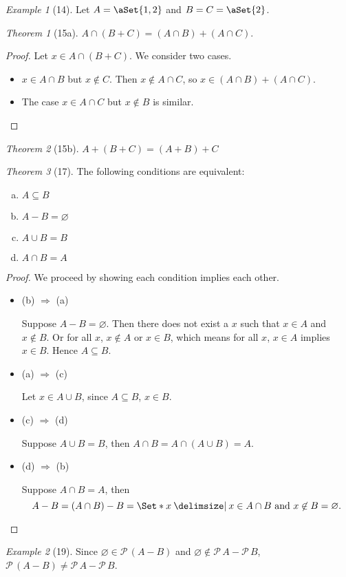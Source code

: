 \documentclass[12pt]{article}
\theoremstyle{plain}
\theoremstyle{remark}
\newtheorem*{exthm}{Theorem}
\newtheorem*{eg}{Example}
\theoremstyle{definition}
\theoremstyle{remark}
\newcommand{\powerset}{\mathscr{P}\,}
\providecommand\st{}
\newcommand\SetSymbol[1][]{%
 \nonscript\:#1\vert%
 \allowbreak%
 \nonscript\:
\mathopen{}}
\renewcommand\st{\SetSymbol[\delimsize]}
\DeclarePairedDelimiter\aSet\{\}
\begin{document}
\begin{eg}[14]
 Let $A = \aSet{1,2}$ and $B = C = \aSet{2}$.
\end{eg}

\begin{exthm}[15a]
 $A \cap (B + C) = (A \cap B) + (A \cap C)$.
\end{exthm}
\begin{proof}
 Let $x \in A \cap (B + C)$. We consider two cases.
 \begin{itemize}
  \item $x \in A \cap B$ but $x \not\in C$. Then $x \not\in A \cap C$, so $x \in (A \cap B) + (A \cap C)$.
  \item The case $x \in A \cap C$ but $x \not\in B$ is similar.
 \end{itemize}
\end{proof}
\begin{exthm}[15b]
 $A + (B + C) = (A + B) + C$
\end{exthm}

\begin{exthm}[17]
 The following conditions are equivalent:
 \begin{multicols}{2}
  \begin{enumerate}[(a)]
   \item $A \subseteq B$
   \item $A - B = \varnothing$
   \item $A \cup B = B$
   \item $A \cap B = A$
  \end{enumerate}
 \end{multicols}
\end{exthm}
\begin{proof}
 We proceed by showing each condition implies each other.
 \begin{itemize}
  \item (b) $\Rightarrow$ (a)

   Suppose $A - B = \varnothing$. Then there does not exist a $x$ such that $x \in A$ and $x \not\in B$. Or for all $x$, $x \not\in A$ or $x \in B$, which means for all $x$, $x \in A$ implies $x \in B$. Hence $A \subseteq B$.
  \item (a) $\Rightarrow$ (c)

   Let $x \in A \cup B$, since $A \subseteq B$, $x \in B$.

  \item (c) $\Rightarrow$ (d)

   Suppose $A \cup B = B$, then $A \cap B = A \cap (A \cup B) = A$.

  \item (d) $\Rightarrow$ (b)

   Suppose $A \cap B = A$, then
   \[
   A - B = (A \cap B) - B = \Set*{x \st x \in A \cap B\ \text{and}\ x \not\in B} = \varnothing.
  \]

 \end{itemize}
\end{proof}
\begin{eg}[19]
 Since $\varnothing \in \powerset (A - B)$ and $\varnothing \not\in \powerset A - \powerset B$, $\powerset(A - B) \neq \powerset A - \powerset B$.
\end{eg}
\end{document}
